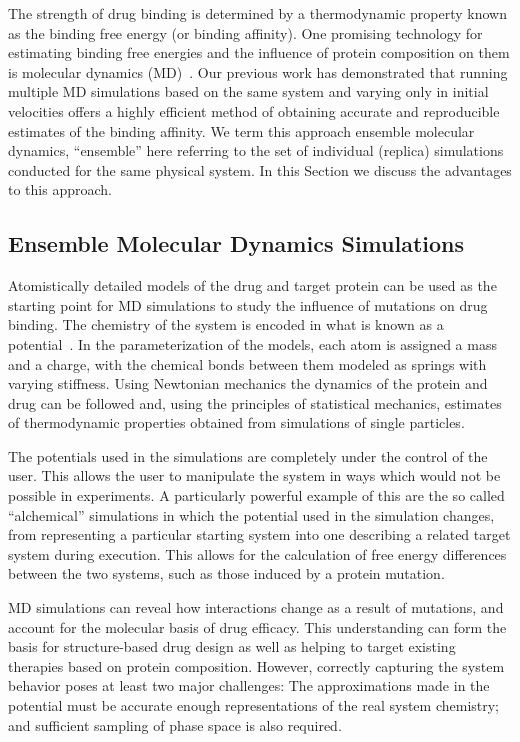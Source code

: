 The strength of drug binding is determined by a thermodynamic property known
as the binding free energy (or binding affinity). One promising technology for
estimating binding free energies and the influence of protein composition on
them is molecular dynamics (MD)~\cite{Karplus2005}. Our previous work
\cite{Sadiq2010, Wan2011} has demonstrated that running multiple MD
simulations based on the same system and varying only in initial velocities
offers a highly efficient method of obtaining accurate and reproducible
estimates of the binding affinity. We term this approach ensemble molecular
dynamics, ``ensemble'' here referring to the set of individual (replica)
simulations conducted for the same physical system. In this Section we discuss
the advantages to this approach.

\subsection{Ensemble Molecular Dynamics Simulations}

Atomistically detailed models of the drug and target protein can be used as the
starting point for MD simulations to
study the influence of mutations on drug binding. The chemistry of the system
is encoded in what is known as a potential~\cite{Karplus2002}. In the
parameterization of the models, each atom is assigned a mass and a charge,
with the chemical bonds between them modeled as springs with varying
stiffness. Using Newtonian mechanics the dynamics of the protein and drug can
be followed and, using the principles of statistical mechanics, estimates of
thermodynamic properties obtained from simulations of single particles.

The potentials used in the simulations are completely under the control of
the user. This allows the user to manipulate the system in ways which would
not be possible in experiments. A particularly powerful example of this are
the so called ``alchemical'' simulations in which the potential used in the
simulation changes, from representing a particular starting system into one 
describing a related target system during execution. This allows for the 
calculation of free energy differences between the two systems, such as those 
induced by a protein mutation.

MD simulations can reveal how interactions change as a result of mutations,
and account for the molecular basis of drug efficacy. This understanding can
form the basis for structure-based drug design as well as helping to target
existing therapies based on protein composition. However, correctly capturing
the system behavior poses at least two major challenges: The approximations
made in the potential must be accurate enough representations of the real
system chemistry; and sufficient sampling of phase space is also required.

